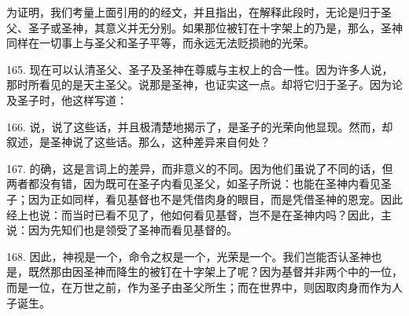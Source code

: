 为证明，我们考量上面引用的的经文，并且指出，在解释此段时，无论是归于圣父、圣子或圣神，其意义并无分别。如果那位被钉在十字架上的乃是，那么，圣神同样在一切事上与圣父和圣子平等，而永远无法贬损祂的光荣。\par

165. 现在可以认清圣父、圣子及圣神在尊威与主权上的合一性。因为许多人说，那时所看见的是天主圣父。说那是圣神，也证实这一点。却将它归于圣子。因为论及圣子时，他这样写道：\par

166. 说，说了这些话，并且极清楚地揭示了，是圣子的光荣向他显现。然而，却叙述，是圣神说了这些话。那么，这种差异来自何处？\par

167. 的确，这是言词上的差异，而非意义的不同。因为他们虽说了不同的话，但两者都没有错，因为既可在圣子内看见圣父，如圣子所说：也能在圣神内看见圣子；因为正如同样，看见基督也不是凭借肉身的眼目，而是凭借圣神的恩宠。因此经上也说：而当时已看不见了，他如何看见基督，岂不是在圣神内吗？因此，主说：因为先知们也是领受了圣神而看见基督的。\par

168. 因此，神视是一个，命令之权是一个，光荣是一个。我们岂能否认圣神也是，既然那由因圣神而降生的被钉在十字架上了呢？因为基督并非两个中的一位，而是一位，在万世之前，作为圣子由圣父所生；而在世界中，则因取肉身而作为人子诞生。\par

